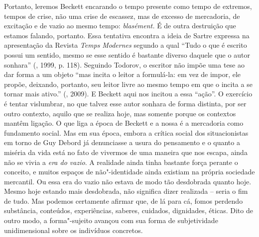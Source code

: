 Portanto, leremos Beckett encarando o tempo presente como tempo de
extremos, tempos de crise, não uma crise de escassez, mas de excesso de
mercadoria, de excitação e de vazio ao mesmo tempo: \emph{blasément.} É
de outra destruição que estamos falando, portanto. Essa tentativa
encontra a ideia de Sartre expressa na apresentação da Revista
\emph{Temps} \emph{Modernes} segundo a qual ``Tudo o que é escrito
possui um sentido, mesmo se esse sentido é bastante diverso daquele que
o autor sonhara'' (, 1999, p. 118). Seguindo Todorov, o escritor
não impõe uma tese ao dar forma a um objeto ``mas incita o leitor a
formulá-la: em vez de impor, ele propõe, deixando, portanto, seu leitor
livre ao mesmo tempo em que o incita a se tornar mais ativo.'' (,
2009). E Beckett aqui nos incitou a essa ``ação''. O exercício é tentar
vislumbrar, no que talvez esse autor sonhara de forma distinta, por ser
outro contexto, aquilo que se realiza hoje, mas somente porque os
contextos mantêm ligação. O que liga a época de Beckett e a nossa é a
mercadoria como fundamento social. Mas em sua época, embora a crítica
social dos situacionistas em torno de Guy Debord já denunciasse a usura
do pensamento e o quanto a miséria da vida está no fato de vivermos de
uma maneira que nos escapa, ainda não se vivia a \emph{era do vazio}. A
realidade ainda tinha bastante força perante o conceito, e muitos
espaços de não"-identidade ainda existiam na própria sociedade mercantil.
Ou essa era do vazio não estava de modo tão desdobrada quanto hoje.
Mesmo hoje estando mais desdobrada, não significa dizer realizada --
seria o fim de tudo. Mas podemos certamente afirmar que, de lá para cá,
fomos perdendo substância, conteúdos, experiências, saberes, cuidados,
dignidades, éticas. Dito de outro modo, a forma"-sujeito avançou com sua
forma de subjetividade unidimensional sobre os indivíduos concretos.

